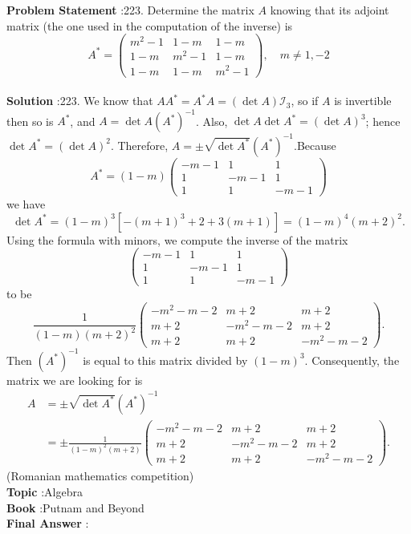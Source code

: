 \documentclass[10pt]{article}
\begin{document}
\textbf{Problem Statement} :223. Determine the matrix $A$ knowing that its adjoint matrix (the one used in the computation of the inverse) is$$ A^{*}=\left(\begin{array}{ccc} m^{2}-1 & 1-m & 1-m \\ 1-m & m^{2}-1 & 1-m \\ 1-m & 1-m & m^{2}-1 \end{array}\right), \quad m \neq 1,-2 $$\\
\textbf{Solution} :223. We know that $A A^{*}=A^{*} A=(\operatorname{det} A) \mathcal{I}_{3}$, so if $A$ is invertible then so is $A^{*}$, and $A=\operatorname{det} A\left(A^{*}\right)^{-1}$. Also, $\operatorname{det} A \operatorname{det} A^{*}=(\operatorname{det} A)^{3}$; hence $\operatorname{det} A^{*}=(\operatorname{det} A)^{2}$. Therefore, $A=\pm \sqrt{\operatorname{det} A^{*}}\left(A^{*}\right)^{-1}$.Because$$ A^{*}=(1-m)\left(\begin{array}{ccc} -m-1 & 1 & 1 \\ 1 & -m-1 & 1 \\ 1 & 1 & -m-1 \end{array}\right) $$we have$$ \operatorname{det} A^{*}=(1-m)^{3}\left[-(m+1)^{3}+2+3(m+1)\right]=(1-m)^{4}(m+2)^{2} . $$Using the formula with minors, we compute the inverse of the matrix$$ \left(\begin{array}{ccc} -m-1 & 1 & 1 \\ 1 & -m-1 & 1 \\ 1 & 1 & -m-1 \end{array}\right) $$to be$$ \frac{1}{(1-m)(m+2)^{2}}\left(\begin{array}{ccc} -m^{2}-m-2 & m+2 & m+2 \\ m+2 & -m^{2}-m-2 & m+2 \\ m+2 & m+2 & -m^{2}-m-2 \end{array}\right) . $$Then $\left(A^{*}\right)^{-1}$ is equal to this matrix divided by $(1-m)^{3}$. Consequently, the matrix we are looking for is$$ \begin{aligned} A &=\pm \sqrt{\operatorname{det} A^{*}}\left(A^{*}\right)^{-1} \\ &=\pm \frac{1}{(1-m)^{2}(m+2)}\left(\begin{array}{ccc} -m^{2}-m-2 & m+2 & m+2 \\ m+2 & -m^{2}-m-2 & m+2 \\ m+2 & m+2 & -m^{2}-m-2 \end{array}\right) . \end{aligned} $$(Romanian mathematics competition)\\
\textbf{Topic} :Algebra\\
\textbf{Book} :Putnam and Beyond\\
\textbf{Final Answer} :\\
\end{document}
